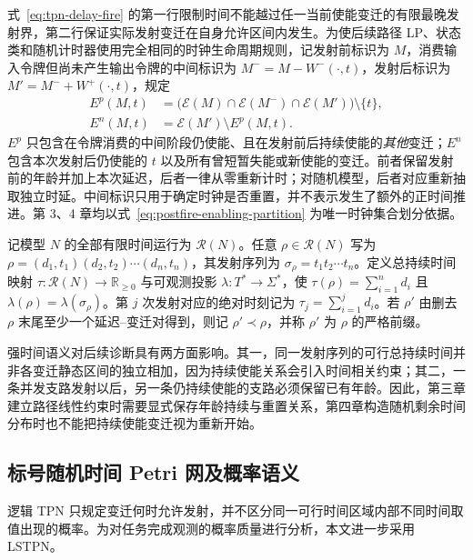 \documentclass[master,fontset=ubuntu]{shnuthesis}
\theoremstyle{definition}
\begin{document}
式~\eqref{eq:tpn-delay-fire} 的第一行限制时间不能越过任一当前使能变迁的有限最晚发射界，第二行保证实际发射变迁在自身允许区间内发生。为使后续路径 LP、状态类和随机计时器使用完全相同的时钟生命周期规则，记发射前标识为 $M$，消费输入令牌但尚未产生输出令牌的中间标识为 $M^-=M-W^-(\cdot,t)$，发射后标识为 $M'=M^-+W^+(\cdot,t)$，规定
\begin{equation}
\begin{aligned}
E^p(M,t)&=\bigl(\mathcal E(M)\cap\mathcal E(M^-)\cap\mathcal E(M')\bigr)\setminus\{t\},\\
E^n(M,t)&=\mathcal E(M')\setminus E^p(M,t).
\end{aligned}
\label{eq:postfire-enabling-partition}
\end{equation}
$E^p$ 只包含在令牌消费的中间阶段仍使能、且在发射前后持续使能的\emph{其他}变迁；$E^n$ 包含本次发射后仍使能的 $t$ 以及所有曾短暂失能或新使能的变迁。前者保留发射前的年龄并加上本次延迟，后者一律从零重新计时；对随机模型，后者对应重新抽取独立时延。中间标识只用于确定时钟是否重置，并不表示发生了额外的正时间推进。第 3、4 章均以式~\eqref{eq:postfire-enabling-partition} 为唯一时钟集合划分依据。

记模型 \(N\) 的全部有限时间运行为 \(\mathcal R(N)\)。任意 \(\rho\in\mathcal R(N)\) 写为 \(\rho=(d_1,t_1)(d_2,t_2)\cdots(d_n,t_n)\)，其发射序列为 \(\sigma_\rho=t_1t_2\cdots t_n\)。定义总持续时间映射 \(\tau:\mathcal R(N)\rightarrow\mathbb R_{\geq0}\) 与可观测投影 \(\lambda:T^*\rightarrow\Sigma^*\)，使 \(\tau(\rho)=\sum_{i=1}^{n}d_i\) 且 \(\lambda(\rho)=\lambda(\sigma_\rho)\)。第 \(j\) 次发射对应的绝对时刻记为 \(\tau_j=\sum_{i=1}^{j}d_i\)。若 \(\rho'\) 由删去 \(\rho\) 末尾至少一个延迟--变迁对得到，则记 \(\rho'\prec\rho\)，并称 \(\rho'\) 为 \(\rho\) 的严格前缀。

强时间语义对后续诊断具有两方面影响。其一，同一发射序列的可行总持续时间并非各变迁静态区间的独立相加，因为持续使能关系会引入时间相关约束；其二，一条并发支路发射以后，另一条仍持续使能的支路必须保留已有年龄。因此，第三章建立路径线性约束时需要显式保存年龄持续与重置关系，第四章构造随机剩余时间分布时也不能把持续使能变迁视为重新开始。

\subsection{标号随机时间 Petri 网及概率语义}

逻辑 TPN 只规定变迁何时允许发射，并不区分同一可行时间区域内部不同时间取值出现的概率。为对任务完成观测的概率质量进行分析，本文进一步采用 LSTPN。
\end{document}

